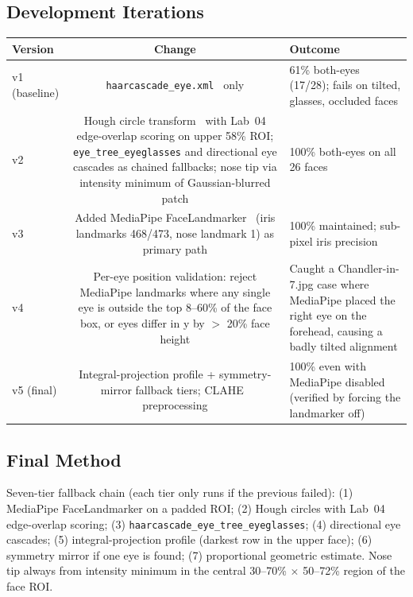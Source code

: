 \documentclass[11pt,a4paper,titlepage]{article}
\begin{document}
\subsection{Development Iterations}
\noindent
\begin{tabularx}{\linewidth}{@{}V C O@{}}
\toprule
\textbf{Version} & \textbf{Change} & \textbf{Outcome} \\
\midrule
v1 (baseline) & \texttt{haarcascade\_eye.xml}~\citep{viola2001rapid} only
              & 61\% both-eyes (17/28); fails on tilted, glasses, occluded faces \\
v2 & Hough circle transform~\citep{yuen1990hough} with Lab~04 edge-overlap
     scoring on upper 58\% ROI; \texttt{eye\_tree\_eyeglasses} and directional
     eye cascades as chained fallbacks; nose tip via intensity minimum of
     Gaussian-blurred patch
   & 100\% both-eyes on all 26 faces \\
v3 & Added MediaPipe FaceLandmarker~\citep{lugaresi2019mediapipe} (iris
     landmarks 468/473, nose landmark 1) as primary path
   & 100\% maintained; sub-pixel iris precision \\
v4 & Per-eye position validation: reject MediaPipe landmarks where any single
     eye is outside the top 8--60\% of the face box, or eyes differ in y by
     $>$ 20\% face height
   & Caught a Chandler-in-7.jpg case where MediaPipe placed the right eye on
     the forehead, causing a badly tilted alignment \\
v5 (final) & Integral-projection profile + symmetry-mirror fallback tiers;
             CLAHE~\citep{zuiderveld1994clahe} preprocessing
           & 100\% even with MediaPipe disabled (verified by forcing the
             landmarker off) \\
\bottomrule
\end{tabularx}

\subsection{Final Method}
Seven-tier fallback chain (each tier only runs if the previous failed):
(1) MediaPipe FaceLandmarker on a padded ROI;
(2) Hough circles with Lab~04 edge-overlap scoring;
(3) \texttt{haarcascade\_eye\_tree\_eyeglasses};
(4) directional eye cascades;
(5) integral-projection profile (darkest row in the upper face);
(6) symmetry mirror if one eye is found;
(7) proportional geometric estimate.
Nose tip always from intensity minimum in the central 30--70\% $\times$ 50--72\%
region of the face ROI.
\end{document}
